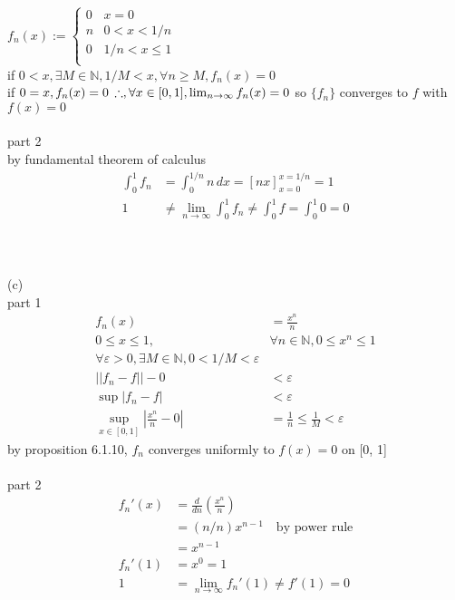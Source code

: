 \documentclass[12pt, border = 4pt, multi]{article} %
\begin{document}
$f_n(x) :=
\begin{cases}
0 & x = 0\\
n & 0 < x < 1 / n\\
0 & 1 / n < x \leq 1\\
\end{cases}$\\
if $0 < x, \exists M \in \mathbb{N}, 1 / M < x, \forall n \geq M, f_n(x) = 0$\\
if $0 = x, f_n(x) = 0\\$
$\therefore, \forall x \in [0, 1], \lim_{n \rightarrow \infty} f_n(x) = 0\\$
so $\{f_n\}$ converges to $f$ with $f(x) = 0$\\
\\
part 2\\
by fundamental theorem of calculus
\begin{align*}
\int_0 ^ 1 f_n &= \int_0 ^ {1 / n} n\,dx = [nx]_{x = 0} ^ {x = 1 / n} = 1\\
1 &\not= \lim_{n \rightarrow \infty} \int_0 ^ 1 f_n \not= \int_0 ^ 1 f = \int_0 ^ 1 0 = 0
\end{align*}
\\
\\
\\
(c)\\
part 1
\begin{align*}
f_n(x) &= \frac{x ^ n}{n}\\
0 \leq x \leq 1, &\forall n \in \mathbb{N}, 0 \leq x ^ n \leq 1\\
\forall \varepsilon > 0, \exists M \in \mathbb{N}, 0 < 1 / M < \varepsilon\\
||f_n - f|| - 0 &< \varepsilon\\
\sup|f_n - f| &< \varepsilon\\
\sup_{x \in [0, 1]}\left|\frac{x ^ n}{n} - 0\right| &= \frac{1}{n} \leq \frac{1}{M} < \varepsilon
\end{align*}
by proposition 6.1.10, $f_n$ converges uniformly to $f(x) = 0$ on [0, 1]\\
\\
part 2
\begin{align*}
f_n'(x) &= \frac{d}{dn}\left(\frac{x ^ n}{n}\right)\\
&= (n / n) x ^ {n - 1} \quad\text{by power rule}\\
&= x ^ {n - 1}\\
f_n'(1) &= x ^ 0 = 1\\
1 &= \lim_{n \rightarrow \infty} f_n'(1) \not= f'(1) = 0
\end{align*}
\end{document}
